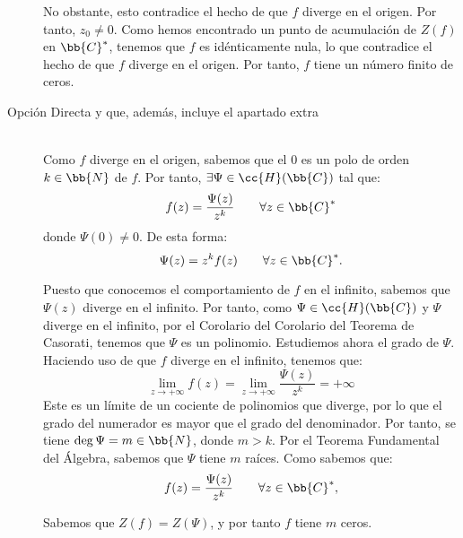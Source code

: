 \documentclass[12pt]{article}
\begin{document}
\begin{ejercicio}[2.5 + 1.5 puntos]
\begin{description}
                No obstante, esto contradice el hecho de que $f$ diverge en el origen. Por tanto, $z_0\neq 0$. Como hemos encontrado un punto de acumulación de $Z(f)$ en $\bb{C}^*$, tenemos que $f$ es idénticamente nula, lo que contradice el hecho de que $f$ diverge en el origen. Por tanto, $f$ tiene un número finito de ceros.\\
            \item[Opción Directa y que, además, incluye el apartado extra]~\\
            
            Como $f$ diverge en el origen, sabemos que el $0$ es un polo de orden $k\in \bb{N}$ de $f$. Por tanto, $\exists \Psi\in \cc{H}(\bb{C})$ tal que:
            \begin{equation*}
                f(z) = \dfrac{\Psi(z)}{z^k}\qquad \forall z\in \bb{C}^*
            \end{equation*}
            donde $\Psi(0)\neq 0$. De esta forma:
            \begin{equation*}
                \Psi(z) = z^k f(z)\qquad \forall z\in \bb{C}^*.
            \end{equation*}
    
            Puesto que conocemos el comportamiento de $f$ en el infinito, sabemos que $\Psi(z)$ diverge en el infinito. Por tanto, como $\Psi\in \cc{H}(\bb{C})$ y $\Psi$ diverge en el infinito, por el Corolario del Corolario del Teorema de Casorati, tenemos que $\Psi$ es un polinomio. Estudiemos ahora el grado de $\Psi$. Haciendo uso de que $f$ diverge en el infinito, tenemos que:
            \begin{equation*}
                \lim_{z\to +\infty} f(z) = \lim_{z\to +\infty} \dfrac{\Psi(z)}{z^k} = +\infty
            \end{equation*}
            Este es un límite de un cociente de polinomios que diverge, por lo que el grado del numerador es mayor que el grado del denominador. Por tanto, se tiene $\deg \Psi = m\in \bb{N}$, donde $m>k$. Por el Teorema Fundamental del Álgebra, sabemos que $\Psi$ tiene $m$ raíces. Como sabemos que:
            \begin{equation*}
                f(z) = \dfrac{\Psi(z)}{z^k}\qquad \forall z\in \bb{C}^*,
            \end{equation*}
    
            Sabemos que $Z(f) = Z(\Psi)$, y por tanto $f$ tiene $m$ ceros.
        \end{description}
    \end{ejercicio}
\end{document}
